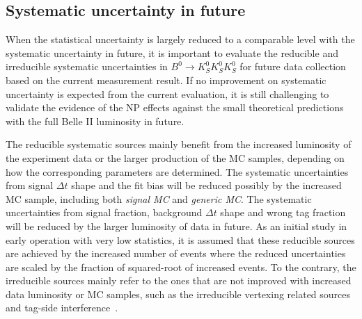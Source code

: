\subsection{Systematic uncertainty in future}

When the statistical uncertainty is largely reduced to a comparable level with the systematic uncertainty in future, it is important to evaluate the reducible and irreducible systematic uncertainties in $B^0 \to K_S^0  K_S^0  K_S^0$ for future data collection based on the current measurement result. If no improvement on systematic uncertainty is expected from the current evaluation, it is still challenging to validate the evidence of the NP effects against the small theoretical predictions with the full Belle II luminosity in future.

The reducible systematic sources mainly benefit from the increased luminosity of the experiment data or the larger production of the MC samples, depending on how the corresponding parameters are determined.
The  systematic uncertainties from signal $\Delta t$ shape and the fit bias will be reduced possibly by the increased MC sample, including both \textit{signal MC} and \textit{generic MC}. The systematic uncertainties from signal fraction, background $\Delta t$ shape and wrong tag fraction will be reduced by the larger luminosity of data in future. 
As an initial study in early operation with very low statistics, it is assumed that these reducible sources are achieved by the increased number of events where the reduced uncertainties are scaled by the fraction of squared-root of increased events. To the contrary, the irreducible sources mainly refer to the ones that are not improved with increased data luminosity or MC samples, such as the irreducible vertexing related sources and tag-side interference~\cite{b2book}.

